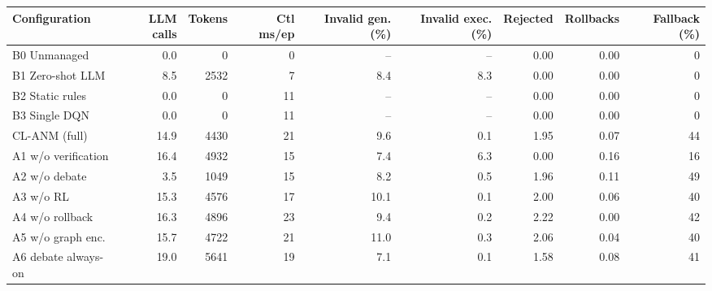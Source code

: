 \begin{tabular}{lrrrrrrrr}
\toprule
Configuration & LLM calls & Tokens & Ctl ms/ep & Invalid gen. (\%) & Invalid exec. (\%) & Rejected & Rollbacks & Fallback (\%) \\
\midrule
B0 Unmanaged & 0.0 & 0 & 0 & -- & -- & 0.00 & 0.00 & 0 \\
B1 Zero-shot LLM & 8.5 & 2532 & 7 & 8.4 & 8.3 & 0.00 & 0.00 & 0 \\
B2 Static rules & 0.0 & 0 & 11 & -- & -- & 0.00 & 0.00 & 0 \\
B3 Single DQN & 0.0 & 0 & 11 & -- & -- & 0.00 & 0.00 & 0 \\
CL-ANM (full) & 14.9 & 4430 & 21 & 9.6 & 0.1 & 1.95 & 0.07 & 44 \\
A1 w/o verification & 16.4 & 4932 & 15 & 7.4 & 6.3 & 0.00 & 0.16 & 16 \\
A2 w/o debate & 3.5 & 1049 & 15 & 8.2 & 0.5 & 1.96 & 0.11 & 49 \\
A3 w/o RL & 15.3 & 4576 & 17 & 10.1 & 0.1 & 2.00 & 0.06 & 40 \\
A4 w/o rollback & 16.3 & 4896 & 23 & 9.4 & 0.2 & 2.22 & 0.00 & 42 \\
A5 w/o graph enc. & 15.7 & 4722 & 21 & 11.0 & 0.3 & 2.06 & 0.04 & 40 \\
A6 debate always-on & 19.0 & 5641 & 19 & 7.1 & 0.1 & 1.58 & 0.08 & 41 \\
\bottomrule
\end{tabular}
